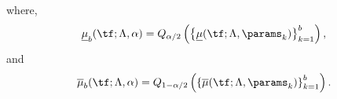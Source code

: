 where,
\begin{equation*}
    \underline{\mu}_{b}(\tf; \Lambda, \alpha) = Q_{\alpha / 2} \left( \left\{ \underline{\mu}(\tf; \Lambda, \params_k)  \right\}_{k = 1}^b \right),
\end{equation*}
and
\begin{equation*}
    \overline{\mu}_{b}(\tf; \Lambda, \alpha) =  Q_{1 - \alpha / 2} \left( \left\{ \overline{\mu}(\tf; \Lambda, \params_k)  \right\}_{k = 1}^b \right).
\end{equation*}


